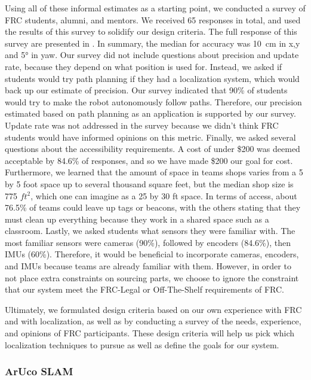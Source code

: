\documentclass{article}
\begin{document}
    Using all of these informal estimates as a starting point, we conducted a survey of FRC students, alumni, and mentors. We received 65 responses in total, and used the results of this survey to solidify our design criteria. The full response of this survey are presented in . In summary, the median for accuracy was \SI{10}{\centi\meter} in x,y and \ang{5} in yaw. Our survey did not include questions about precision and update rate, because they depend on what position is used for. Instead, we asked if students would try path planning if they had a localization system, which would back up our estimate of precision. Our survey indicated that 90\% of students would try to make the robot autonomously follow paths. Therefore, our precision estimated based on path planning as an application is supported by our survey. Update rate was not addressed in the survey because we didn't think FRC students would have informed opinions on this metric. Finally, we asked several questions about the accessibility requirements. A cost of under \$200 was deemed acceptable by 84.6\% of responses, and so we have made \$200 our goal for cost. Furthermore, we learned that the amount of space in teams shops varies from a 5 by 5 foot space up to several thousand square feet, but the median shop size is 775 $ft^2$, which one can imagine as a 25 by 30 ft space. In terms of access, about 76.5\% of teams could leave up tags or beacons, with the others stating that they must clean up everything because they work in a shared space such as a classroom. Lastly, we asked students what sensors they were familiar with. The most familiar sensors were cameras (90\%), followed by encoders (84.6\%), then IMUs (60\%). Therefore, it would be beneficial to incorporate cameras, encoders, and IMUs because teams are already familiar with them. However, in order to not place extra constraints on sourcing parts, we choose to ignore the constraint that our system meet the FRC-Legal or Off-The-Shelf requirements of FRC.

    Ultimately, we formulated design criteria based on our own experience with FRC and with localization, as well as by conducting a survey of the needs, experience, and opinions of FRC participants. These design criteria will help us pick which localization techniques to pursue as well as define the goals for our system.

	\subsubsection{ArUco SLAM}
\end{document}

